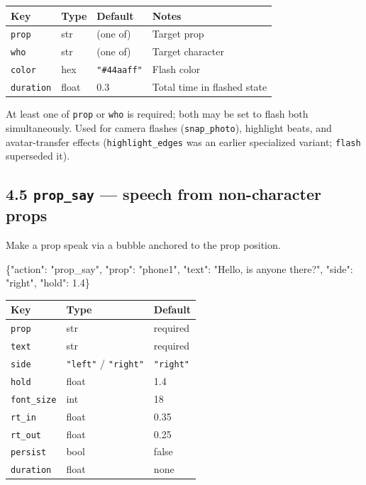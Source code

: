 \documentclass[
  12pt,
  letterpaper,
]{book}
\newenvironment{Shaded}{}{}
\newcommand{\DataTypeTok}[1]{\textcolor[rgb]{0.56,0.13,0.00}{#1}}
\newcommand{\FloatTok}[1]{\textcolor[rgb]{0.25,0.63,0.44}{#1}}
\newcommand{\FunctionTok}[1]{\textcolor[rgb]{0.02,0.16,0.49}{#1}}
\newcommand{\StringTok}[1]{\textcolor[rgb]{0.25,0.44,0.63}{#1}}
\begin{document}
\begin{longtable}[]{@{}llll@{}}
\toprule\noalign{}
Key & Type & Default & Notes \\
\midrule\noalign{}
\endhead
\bottomrule\noalign{}
\endlastfoot
\texttt{prop} & str & (one of) & Target prop \\
\texttt{who} & str & (one of) & Target character \\
\texttt{color} & hex & \texttt{"\#44aaff"} & Flash color \\
\texttt{duration} & float & 0.3 & Total time in flashed state \\
\end{longtable}

At least one of \texttt{prop} or \texttt{who} is required; both may be
set to flash both simultaneously. Used for camera flashes
(\texttt{snap\_photo}), highlight beats, and avatar-transfer effects
(\texttt{highlight\_edges} was an earlier specialized variant;
\texttt{flash} superseded it).

\subsection{\texorpdfstring{4.5 \texttt{prop\_say} --- speech from
non-character
props}{4.5 prop\_say --- speech from non-character props}}\label{prop_say-speech-from-non-character-props}

Make a prop speak via a bubble anchored to the prop position.

\begin{Shaded}
\begin{Highlighting}[]
\FunctionTok{\{}\DataTypeTok{"action"}\FunctionTok{:} \StringTok{"prop\_say"}\FunctionTok{,} \DataTypeTok{"prop"}\FunctionTok{:} \StringTok{"phone1"}\FunctionTok{,}
 \DataTypeTok{"text"}\FunctionTok{:} \StringTok{"Hello, is anyone there?"}\FunctionTok{,}
 \DataTypeTok{"side"}\FunctionTok{:} \StringTok{"right"}\FunctionTok{,} \DataTypeTok{"hold"}\FunctionTok{:} \FloatTok{1.4}\FunctionTok{\}}
\end{Highlighting}
\end{Shaded}

\begin{longtable}[]{@{}lll@{}}
\toprule\noalign{}
Key & Type & Default \\
\midrule\noalign{}
\endhead
\bottomrule\noalign{}
\endlastfoot
\texttt{prop} & str & required \\
\texttt{text} & str & required \\
\texttt{side} & \texttt{"left"} / \texttt{"right"} & \texttt{"right"} \\
\texttt{hold} & float & 1.4 \\
\texttt{font\_size} & int & 18 \\
\texttt{rt\_in} & float & 0.35 \\
\texttt{rt\_out} & float & 0.25 \\
\texttt{persist} & bool & false \\
\texttt{duration} & float & none \\
\end{longtable}
\end{document}
